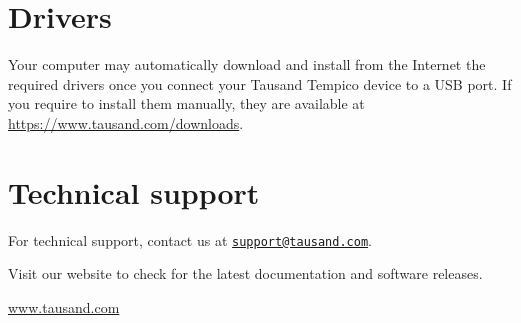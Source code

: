 \documentclass[
]{article}
\begin{document}
\hypertarget{drivers}{%
\section{Drivers}\label{drivers}}

Your computer may automatically download and install from the Internet
the required drivers once you connect your Tausand Tempico device to a
USB port. If you require to install them manually, they are available at
\url{https://www.tausand.com/downloads}.

\hypertarget{technical-support}{%
\section{Technical support}\label{technical-support}}

For technical support, contact us at
\href{mailto:support@tausand.com}{\nolinkurl{support@tausand.com}}.

Visit our website to check for the latest documentation and software
releases.

\href{http://www.tausand.com}{www.tausand.com}
\end{document}
